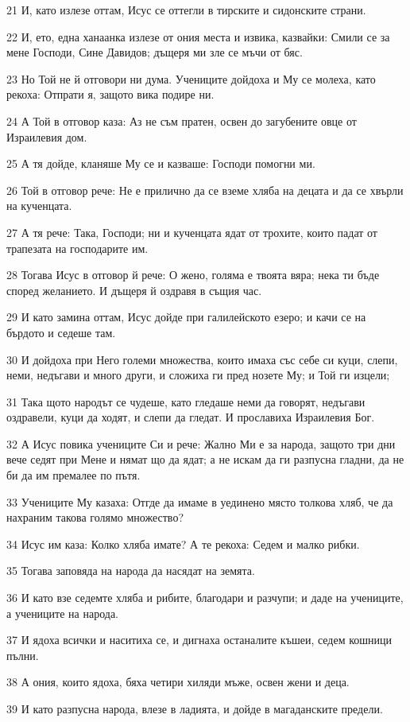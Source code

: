 \par 21 И, като излезе оттам, Исус се оттегли в тирските и сидонските страни.
\par 22 И, ето, една ханаанка излезе от ония места и извика, казвайки: Смили се за мене Господи, Сине Давидов; дъщеря ми зле се мъчи от бяс.
\par 23 Но Той не й отговори ни дума. Учениците дойдоха и Му се молеха, като рекоха: Отпрати я, защото вика подире ни.
\par 24 А Той в отговор каза: Аз не съм пратен, освен до загубените овце от Израилевия дом.
\par 25 А тя дойде, кланяше Му се и казваше: Господи помогни ми.
\par 26 Той в отговор рече: Не е прилично да се вземе хляба на децата и да се хвърли на кученцата.
\par 27 А тя рече: Така, Господи; ни и кученцата ядат от трохите, които падат от трапезата на господарите им.
\par 28 Тогава Исус в отговор й рече: О жено, голяма е твоята вяра; нека ти бъде според желанието. И дъщеря й оздравя в същия час.
\par 29 И като замина оттам, Исус дойде при галилейското езеро; и качи се на бърдото и седеше там.
\par 30 И дойдоха при Него големи множества, които имаха със себе си куци, слепи, неми, недъгави и много други, и сложиха ги пред нозете Му; и Той ги изцели;
\par 31 Така щото народът се чудеше, като гледаше неми да говорят, недъгави оздравели, куци да ходят, и слепи да гледат. И прославиха Израилевия Бог.
\par 32 А Исус повика учениците Си и рече: Жално Ми е за народа, защото три дни вече седят при Мене и нямат що да ядат; а не искам да ги разпусна гладни, да не би да им премалее по пътя.
\par 33 Учениците Му казаха: Отгде да имаме в уединено място толкова хляб, че да нахраним такова голямо множество?
\par 34 Исус им каза: Колко хляба имате? А те рекоха: Седем и малко рибки.
\par 35 Тогава заповяда на народа да насядат на земята.
\par 36 И като взе седемте хляба и рибите, благодари и разчупи; и даде на учениците, а учениците на народа.
\par 37 И ядоха всички и наситиха се, и дигнаха останалите къшеи, седем кошници пълни.
\par 38 А ония, които ядоха, бяха четири хиляди мъже, освен жени и деца.
\par 39 И като разпусна народа, влезе в ладията, и дойде в магаданските предели.

